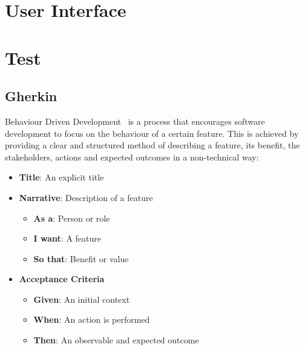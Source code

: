 \documentclass[10pt,a4paper,openany]{mudbook}
\begin{document}

\part{User Interface}


\part{Test}


\chapter{Gherkin}
\label{chp:test-gherkin}

Behaviour Driven Development~%
 is a process that encourages software
development to focus on the behaviour of a certain feature. This is
achieved by providing a clear and structured method of describing a feature,
its benefit, the stakeholders, actions and expected outcomes in a
non-technical way:

\begin{itemize}
  \item[] \textbf{Title}: An explicit title
  \item[] \textbf{Narrative}: Description of a feature
  \begin{itemize}
    \item[] \textbf{As a}: Person or role
    \item[] \textbf{I want}: A feature
    \item[] \textbf{So that}: Benefit or value
  \end{itemize}
  \item[] \textbf{Acceptance Criteria}
  \begin{itemize}
    \item[] \textbf{Given}: An initial context
    \item[] \textbf{When}: An action is performed
    \item[] \textbf{Then}: An observable and expected outcome
  \end{itemize}
\end{itemize}
\end{document}
